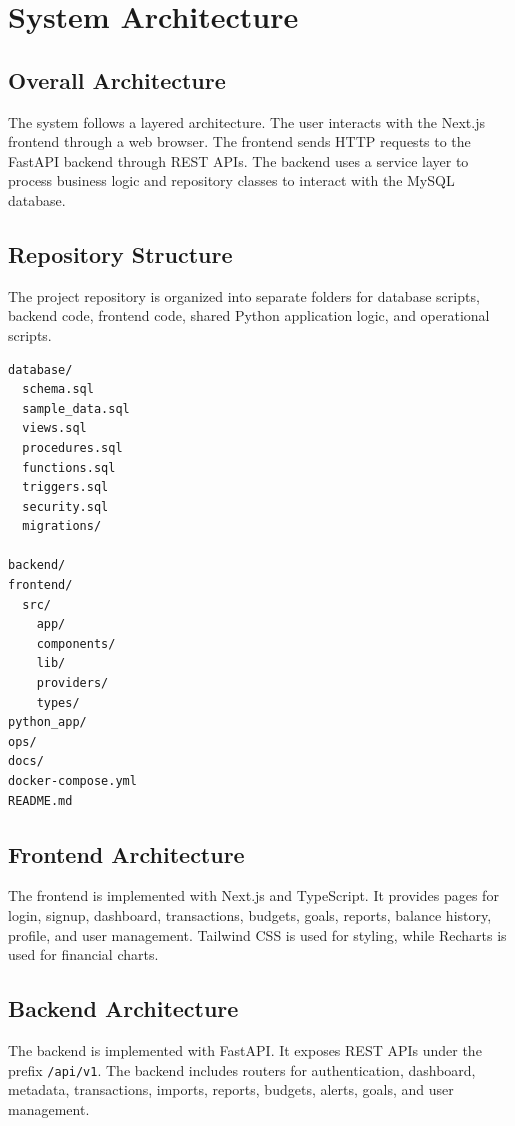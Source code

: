 \documentclass{article}
\begin{document}
\section{System Architecture}

\subsection{Overall Architecture}
The system follows a layered architecture. The user interacts with the Next.js frontend through a web browser. The frontend sends HTTP requests to the FastAPI backend through REST APIs. The backend uses a service layer to process business logic and repository classes to interact with the MySQL database.

\subsection{Repository Structure}
The project repository is organized into separate folders for database scripts, backend code, frontend code, shared Python application logic, and operational scripts.

\begin{lstlisting}[style=codestyle, caption={Main repository structure}]
database/
  schema.sql
  sample_data.sql
  views.sql
  procedures.sql
  functions.sql
  triggers.sql
  security.sql
  migrations/

backend/
frontend/
  src/
    app/
    components/
    lib/
    providers/
    types/
python_app/
ops/
docs/
docker-compose.yml
README.md
\end{lstlisting}

\subsection{Frontend Architecture}
The frontend is implemented with Next.js and TypeScript. It provides pages for login, signup, dashboard, transactions, budgets, goals, reports, balance history, profile, and user management. Tailwind CSS is used for styling, while Recharts is used for financial charts.

\subsection{Backend Architecture}
The backend is implemented with FastAPI. It exposes REST APIs under the prefix \texttt{/api/v1}. The backend includes routers for authentication, dashboard, metadata, transactions, imports, reports, budgets, alerts, goals, and user management.
\end{document}
